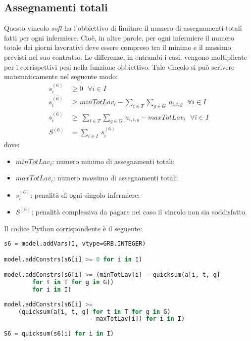\subsection{Assegnamenti totali}
Questo vincolo \textit{soft} ha l'obbiettivo di limitare il numero di assegnamenti totali fatti per ogni infermiere. Cioè, in altre parole, per ogni infermiere il numero totale dei giorni lavorativi deve essere compreso tra il minimo e il massimo previsti nel suo contratto. Le differenze, in entrambi i casi, vengono moltiplicate per i corrispettivi pesi nella funzione obbiettivo.
Tale vincolo si può scrivere matematicamente nel seguente modo:
\begin{equation}
\begin{split}
s^{(6)}_{i} &\geq 0 ~~~ \forall i \in I \\
s^{(6)}_{i} ~ &\geq minTotLav_i - \sum_{t \in T} \sum_{g \in G} ~ a_{i, t, g} ~~~ \forall i \in   I \\
s^{(6)}_{i} ~ &\geq ~ \sum_{t \in T} \sum_{g \in G} ~ a_{i, t, g} - maxTotLav_i  ~~~ \forall i \in I \\
S^{(6)} &= \sum_{i \in I} ~ s^{(6)}_{i}
\end{split}
\end{equation}
dove:
\begin{itemize}
\item $minTotLav_i$: numero minimo di assegnamenti totali;
\item $maxTotLav_i$: numero massimo di assegnamenti totali;
\item $s^{(6)}_{i}$: penalità di ogni singolo infermiere;
\item $S^{(6)}$: penalità complessiva da pagare nel caso il vincolo non sia soddisfatto.
\end{itemize}

Il codice Python corrispondente è il seguente:
\begin{lstlisting}[language=Python]
s6 = model.addVars(I, vtype=GRB.INTEGER)

model.addConstrs(s6[i] >= 0 for i in I)

model.addConstrs(s6[i] >= (minTotLav[i] - quicksum(a[i, t, g] 
		for t in T for g in G))
   	 	for i in I)
                        
model.addConstrs(s6[i] >= 
	(quicksum(a[i, t, g] for t in T for g in G) 
                        - maxTotLav[i]) for i in I)
                       			 
S6 = quicksum(s6[i] for i in I)
\end{lstlisting}


